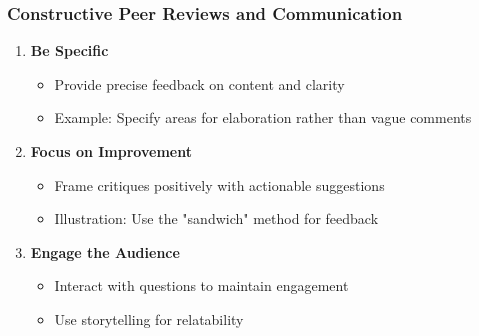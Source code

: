 \documentclass{beamer}
\begin{document}
\begin{frame}[fragile]
    \frametitle{Constructive Peer Reviews and Communication}
    \begin{enumerate}
        \item \textbf{Be Specific}
            \begin{itemize}
                \item Provide precise feedback on content and clarity
                \item Example: Specify areas for elaboration rather than vague comments
            \end{itemize}

        \item \textbf{Focus on Improvement}
            \begin{itemize}
                \item Frame critiques positively with actionable suggestions
                \item Illustration: Use the "sandwich" method for feedback
            \end{itemize}
        
        \item \textbf{Engage the Audience}
            \begin{itemize}
                \item Interact with questions to maintain engagement
                \item Use storytelling for relatability
            \end{itemize}
    \end{enumerate}
\end{frame}
\end{document}
